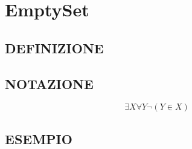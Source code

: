 \chapter{EmptySet}

\section{DEFINIZIONE}

\section{NOTAZIONE}
\[
  \exists X \forall Y \neg (Y \in X)
\]
\section{ESEMPIO}


